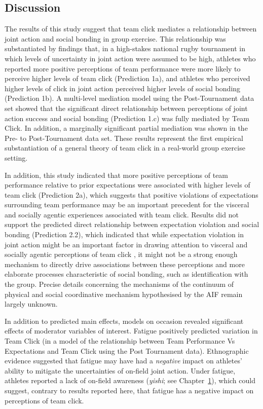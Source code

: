 \begin{CJK}{UTF8}{gbsn}
\section{Discussion}
The results of this study suggest that team click mediates a relationship between joint action and social bonding in group exercise.  This relationship was substantiated by findings that, in a high-stakes national rugby tournament in which levels of uncertainty in joint action were assumed to be high, athletes who reported more positive perceptions of team performance were more likely to perceive higher levels of team click (Prediction 1a), and athletes who perceived higher levels of click in joint action perceived higher levels of social bonding (Prediction 1b).  A multi-level mediation model using the Post-Tournament data set showed that the significant direct relationship between perceptions of joint action success and social bonding (Prediction 1.c) was fully mediated by Team Click. In addition, a marginally significant partial mediation was shown in the Pre- to Post-Tournament data set.  These results represent the first empirical substantiation of a general theory of team click in a real-world group exercise setting.

In addition, this study indicated that more positive perceptions of team performance relative to prior expectations were associated with higher levels of team click (Prediction 2a), which suggests that positive violations of expectations surrounding team performance may be an important precedent for the visceral and socially agentic experiences associated with team click.  Results did not support the predicted direct relationship between expectation violation and social bonding (Prediction 2.2), which indicated that while expectation violation in joint action might be an important factor in drawing attention to visceral and socially agentic perceptions of team click \citep{Chietkrov2014,Clark2015}, it might not be a strong enough mechanism to directly drive associations between these perceptions and more elaborate processes characteristic of social bonding, such as identification with the group.  Precise details concerning the mechanisms of the continuum of physical and social coordinative mechanism hypothesised by the AIF remain largely unknown.

In addition to predicted main effects, models on occasion revealed significant effects of moderator variables of interest.  Fatigue positively predicted variation in Team Click (in a model of the relationship between Team Performance Vs Expectations and Team Click using the Post Tournament data).  Ethnographic evidence suggested that fatigue may have had a \textit{negative} impact on athletes’ ability to mitigate the uncertainties of on-field joint action.  Under fatigue, athletes reported a lack of on-field awareness (\textit{yishi}; see Chapter~\ref{}), which could suggest, contrary to results reported here, that fatigue has a negative impact on perceptions of team click.


\end{CJK}
